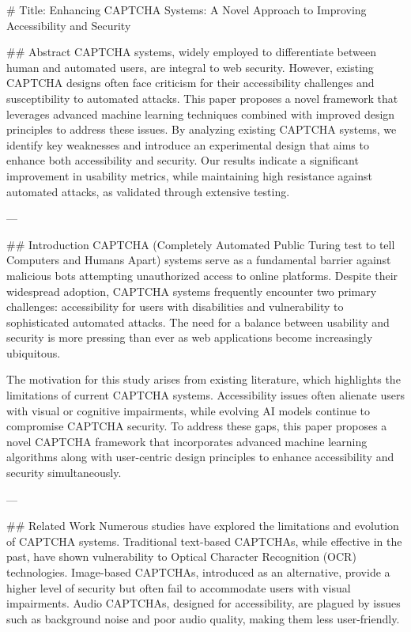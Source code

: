 # Title: Enhancing CAPTCHA Systems: A Novel Approach to Improving Accessibility and Security  

## Abstract  
CAPTCHA systems, widely employed to differentiate between human and automated users, are integral to web security. However, existing CAPTCHA designs often face criticism for their accessibility challenges and susceptibility to automated attacks. This paper proposes a novel framework that leverages advanced machine learning techniques combined with improved design principles to address these issues. By analyzing existing CAPTCHA systems, we identify key weaknesses and introduce an experimental design that aims to enhance both accessibility and security. Our results indicate a significant improvement in usability metrics, while maintaining high resistance against automated attacks, as validated through extensive testing.

---

## Introduction  
CAPTCHA (Completely Automated Public Turing test to tell Computers and Humans Apart) systems serve as a fundamental barrier against malicious bots attempting unauthorized access to online platforms. Despite their widespread adoption, CAPTCHA systems frequently encounter two primary challenges: accessibility for users with disabilities and vulnerability to sophisticated automated attacks. The need for a balance between usability and security is more pressing than ever as web applications become increasingly ubiquitous.  

The motivation for this study arises from existing literature, which highlights the limitations of current CAPTCHA systems. Accessibility issues often alienate users with visual or cognitive impairments, while evolving AI models continue to compromise CAPTCHA security. To address these gaps, this paper proposes a novel CAPTCHA framework that incorporates advanced machine learning algorithms along with user-centric design principles to enhance accessibility and security simultaneously.  

---

## Related Work  
Numerous studies have explored the limitations and evolution of CAPTCHA systems. Traditional text-based CAPTCHAs, while effective in the past, have shown vulnerability to Optical Character Recognition (OCR) technologies. Image-based CAPTCHAs, introduced as an alternative, provide a higher level of security but often fail to accommodate users with visual impairments. Audio CAPTCHAs, designed for accessibility, are plagued by issues such as background noise and poor audio quality, making them less user-friendly.  

